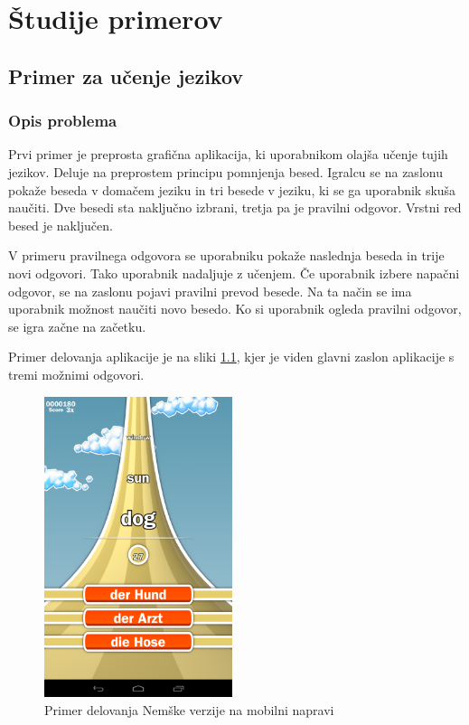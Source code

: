\chapter{Študije primerov}

\section{Primer za učenje jezikov}

\subsection{Opis problema}

Prvi primer je preprosta grafična aplikacija, ki uporabnikom olajša učenje tujih jezikov. Deluje na preprostem principu pomnjenja besed. Igralcu se na zaslonu pokaže beseda v domačem jeziku in tri besede v jeziku, ki se ga uporabnik skuša naučiti. Dve besedi sta naključno izbrani, tretja pa je pravilni odgovor. Vrstni red besed je naključen.

V primeru pravilnega odgovora se uporabniku pokaže naslednja beseda in trije novi odgovori. Tako uporabnik nadaljuje z učenjem. Če uporabnik izbere napačni odgovor, se na zaslonu pojavi pravilni prevod besede. Na ta način se ima uporabnik možnost naučiti novo besedo. Ko si uporabnik ogleda pravilni odgovor, se igra začne na začetku.

Primer delovanja aplikacije je na sliki \ref{german}, kjer je viden glavni zaslon aplikacije s tremi možnimi odgovori.

\begin{figure}
\begin{center}
\includegraphics[width=5.5cm]{pic/defg-german.png}
\end{center}
\caption{Primer delovanja Nemške verzije na mobilni napravi}
\label{german}
\end{figure} 

